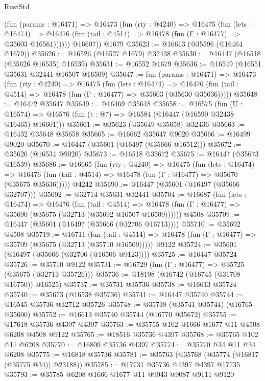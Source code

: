 \begin{lexlean}{RustStd}
\begin{coremodule}
          (fun (params : @16471) =>
          @16473
            (fun (rty : @4240) =>
            @16475
              (fun (lets : @16474) =>
              @16476 (fun (tail : @4514) => @16478 (fun (Γ : @16477) => @35603 @16561))))))
        @16607))
    @1679
@35623 := @16613 (@35596 (@16464 @1679))
@35626 := @16526 (@16527 @1679) @32438
@35630 := @16447 (@16518 (@35626 @16535) @16539)
@35631 := @16552 @1679
@35636 := @16549 (@16551 @35631 @32441 @16507 @16509)
@35647 := fun (params : @16471) =>
  @16473
    (fun (rty : @4240) =>
    @16475
      (fun (lets : @16474) =>
      @16476 (fun (tail : @4514) => @16478 (fun (Γ : @16477) => @35603 (@35630 @35636)))))
@35648 := @16472 @35647
@35649 := @16469 @35648
@35658 := @16575
    (fun (U : @16574) => @16576 (fun (t : @7) => @16584 (@16447 (@16590 @32438 @16465) @16601)))
@35661 := @35623 (@35649 @35658) @32436
@35663 := @16432 @35648 @35658
@35665 := @16662 @35647 @9020
@35666 := @16499 @9020
@35670 := @16447 (@35601 (@16497 (@35666 @16512)))
@35672 := @35626 (@16534 @9020)
@35673 := @16518 @35672
@35675 := @16447 (@35673 @16539)
@35686 := @16665
    (fun (rty : @4240) =>
    @16475
      (fun (lets : @16474) =>
      @16476 (fun (tail : @4514) => @16478 (fun (Γ : @16477) => @35670 (@35675 @35636)))))
    @4242
@35690 := @16447 (@35601 (@16497 (@35666 @32707)))
@35692 := @32714 @35631 @32441
@35704 := @16687
    (fun (lets : @16474) =>
    @16476
      (fun (tail : @4514) =>
      @16478 (fun (Γ : @16477) => @35690 (@35675 (@32713 (@35692 @16507 @16509))))))
    @4508
@35709 := @16447 (@35601 (@16497 (@35666 (@32706 @16713))))
@35710 := @35692 @4508
@35719 := @16711
    (fun (tail : @4514) => @16478 (fun (Γ : @16477) => @35709 (@35675 (@32713 (@35710 @16509)))))
    @9122
@35724 := @35601 (@16497 (@35666 (@32706 (@16506 @9123))))
@35725 := @16447 @35724
@35726 := @35710 @9122
@35731 := @16729 (fun (Γ : @16477) => @35725 (@35675 (@32713 @35726)))
@35736 := @18198 (@16742 (@16745 (@31708 @16750)) @16525)
@35737 := @35731 @35736
@35738 := @16613 @35724
@35740 := @35673 (@16538 @35736)
@35741 := @16447 @35740
@35744 := @16545 @35736 @32712 @35726
@35748 := @35738 (@35741 @35744) (@16765 @35600)
@35752 := @16613 @35740 @35744 (@16770 @35672)
@35755 := @17618 @35736 @4397 @4397
@35763 := @35755 @102 @1666 @1677 @11 @4508 @6208 @4508 @9122
@35765 := @18516 @35736 @4397
@35768 := @35765 @102 @11 @6208
@35770 := @16809 @35736 @4397
@35774 := @35770 @34 @11 @34 @6208
@35775 := @16818 @35736
@35781 := @35763 (@35768 (@35774 (@16817 (@35775 @34)) @23188))
@35785 := @17731 @35736 @4397 @4397 @17735
@35793 := @35785 @6208 @1666 @1677 @11 @9043 @9087 @9111 @9120

\end{coremodule}
\end{lexlean}
